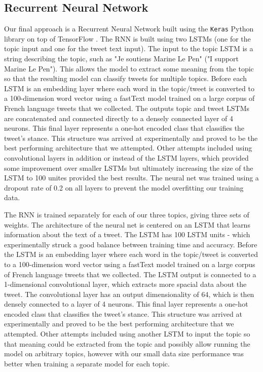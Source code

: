\documentclass[journal]{IEEEtran}
\newcommand{\code}[1]{\texttt{#1}}
\begin{document}
\subsection{Recurrent Neural Network}
Our final approach is a Recurrent Neural Network built using the \code{Keras} \cite{chollet2015} Python library on top of TensorFlow \cite{tensorflow2015-whitepaper}. The RNN is built using two LSTMs (one for the topic input and one for the tweet text input). The input to the topic LSTM is a string describing the topic, such as "Je soutiens Marine Le Pen" ("I support Marine Le Pen"). This allows the model to extract some meaning from the topic so that the resulting model can classify tweets for multiple topics. Before each LSTM is an embedding layer where each word in the topic/tweet is converted to a 100-dimension word vector using a fastText \cite{bojanowski2016enriching} model trained on a large corpus of French language tweets that we collected. The outputs topic and tweet LSTMs are concatenated and connected directly to a densely connected layer of 4 neurons. This final layer represents a one-hot encoded class that classifies the tweet's stance. This structure was arrived at experimentally and proved to be the best performing architecture that we attempted. Other attempts included using convolutional layers in addition or instead of the LSTM layers, which provided some improvement over smaller LSTMs but ultimately increasing the size of the LSTM to 100 unites provided the best results. The neural net was trained using a dropout rate of 0.2 on all layers to prevent the model overfitting our training data.

The RNN is trained separately for each of our three topics, giving three sets of weights. The architecture of the neural net is centered on an LSTM that learns information about the text of a tweet. The LSTM has 100 LSTM units - which experimentally struck a good balance between training time and accuracy. Before the LSTM is an embedding layer where each word in the topic/tweet is converted to a 100-dimension word vector using a fastText \cite{bojanowski2016enriching} model trained on a large corpus of French language tweets that we collected. The LSTM output is connected to a 1-dimensional convolutional layer, which extracts more spacial data about the tweet. The convolutional layer has an output dimensionality of 64, which is then densely connected to a layer of 4 neurons. This final layer represents a one-hot encoded class that classifies the tweet's stance. This structure was arrived at experimentally and proved to be the best performing architecture that we attempted. Other attempts included using another LSTM to input the topic so that meaning could be extracted from the topic and possibly allow running the model on arbitrary topics, however with our small data size performance was better when training a separate model for each topic.
\end{document}
